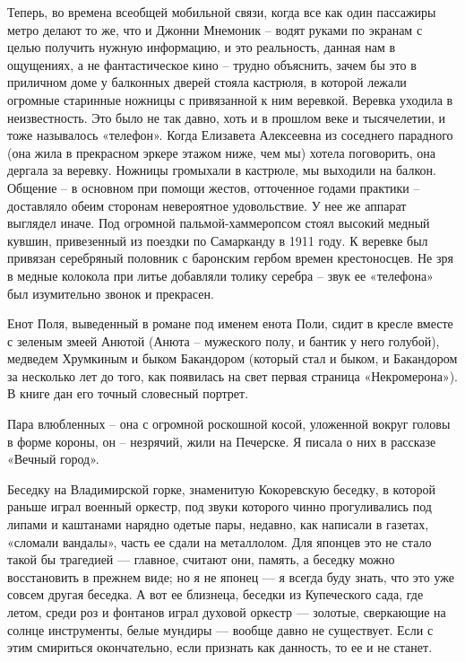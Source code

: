 Теперь, во времена всеобщей мобильной связи, когда все как один пассажиры метро
делают то же, что и Джонни Мнемоник – водят руками по экранам с целью получить
нужную информацию, и это реальность, данная нам в ощущениях, а не
фантастическое кино – трудно объяснить, зачем бы это в приличном доме у
балконных дверей стояла кастрюля, в которой лежали огромные старинные ножницы с
привязанной к ним веревкой. Веревка уходила в неизвестность. Это было не так
давно, хоть и в прошлом веке и тысячелетии, и тоже называлось «телефон». Когда
Елизавета Алексеевна из соседнего парадного (она жила в прекрасном эркере
этажом ниже, чем мы)  хотела поговорить, она дергала за веревку. Ножницы
громыхали в кастрюле, мы выходили на балкон. Общение – в основном при помощи
жестов, отточенное годами практики – доставляло обеим сторонам невероятное
удовольствие. У нее же аппарат выглядел иначе. Под огромной пальмой-хаммеропсом
стоял высокий медный кувшин, привезенный из поездки по Самарканду в 1911 году.
К веревке был привязан серебряный половник с баронским гербом времен
крестоносцев. Не зря в медные колокола при литье добавляли толику серебра –
звук ее «телефона» был изумительно звонок и прекрасен.

Енот Поля, выведенный в романе под именем енота Поли, сидит в кресле вместе с
зеленым змеей Анютой (Анюта – мужеского полу, и бантик у него голубой),
медведем Хрумкиным и быком Бакандором (который стал и быком, и Бакандором за
несколько лет до того, как появилась на свет первая страница «Некромерона»). В
книге дан его точный словесный портрет.

Пара влюбленных – она с огромной роскошной косой, уложенной вокруг головы в
форме короны, он – незрячий, жили на Печерске. Я писала о них в рассказе
«Вечный город».

Беседку на Владимирской горке, знаменитую Кокоревскую беседку, в которой раньше
играл военный оркестр, под звуки которого чинно прогуливались под липами и
каштанами нарядно одетые пары, недавно, как написали в газетах, «сломали
вандалы», часть ее сдали на металлолом. Для японцев это не стало такой бы
трагедией — главное, считают они, память, а беседку можно восстановить в
прежнем виде; но я не японец — я всегда буду знать, что это уже совсем другая
беседка. А вот ее близнеца, беседки из Купеческого сада, где летом, среди роз и
фонтанов играл духовой оркестр — золотые, сверкающие на солнце инструменты,
белые мундиры — вообще давно не существует. Если с этим смириться окончательно,
если признать как данность, то ее и не станет.

